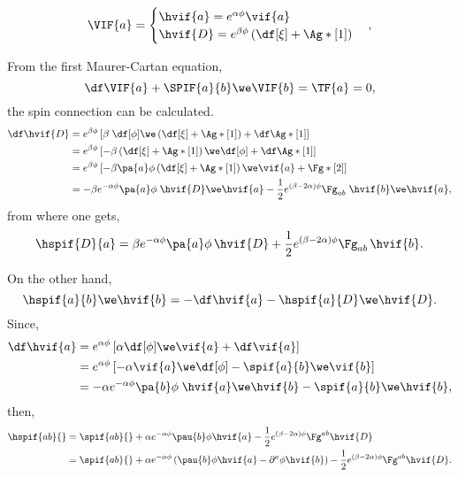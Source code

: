 \begin{equation}
  \VIF{a} = 
  \begin{cases}
    \hvif{a} = e^{\alpha\phi} \vif{a}\\
    \hvif{D} = e^{\beta\phi} \left( \df[\xi] + \Ag*[1] \right)
  \end{cases},
\end{equation}

From the first Maurer-Cartan equation,
\begin{equation}
  \df \VIF{a} + \SPIF{a}{b} \we \VIF{b} = \TF{a} = 0,
\end{equation}
the spin connection can be calculated.
\begin{align}
  \df\hvif{D}
  &= e^{\beta \phi} \left[ \beta \; \df[\phi] \we \left( \df[\xi] + \Ag*[1] \right) + \df\Ag*[1] \right] \nonumber\\
  &= e^{\beta \phi} \left[ -\beta \left( \df[\xi] + \Ag*[1] \right) \we \df[\phi] + \df \Ag*[1] \right] \nonumber\\
  &= e^{\beta \phi} \left[ -\beta \pa{a}\phi \left( \df[\xi] + \Ag*[1] \right) \we \vif{a} + \Fg*[2] \right] \nonumber\\
  &= - \beta e^{-\alpha \phi} \pa{a} \phi \; \hvif{D} \we \hvif{a} - \frac{1}{2} e^{(\beta - 2\alpha) \phi} \Fg_{a b} \; \hvif{b} \we \hvif{a},
\end{align}
from where one gets,
\begin{equation}
  \hspif{D}{a} = \beta e^{-\alpha \phi} \pa{a} \phi \, \hvif{D} + \frac{1}{2} e^{(\beta - 2\alpha) \phi} \Fg_{a b} \, \hvif{b}.
\end{equation}

On the other hand,
\begin{equation}
  \hspif{a}{b} \we \hvif{b} = - \df\hvif{a} - \hspif{a}{D} \we \hvif{D}.
\end{equation}
Since,
\begin{align}
  \df\hvif{a} 
  &= e^{\alpha \phi} \left[ \alpha \df[\phi] \we \vif{a} +  \df\vif{a} \right] \nonumber\\
  &= e^{\alpha \phi} \left[ -\alpha \vif{a} \we\df[\phi] -  \spif{a}{b} \we \vif{b} \right] \nonumber\\
  &= -\alpha e^{-\alpha \phi} \pa{b} \phi \; \hvif{a} \we \hvif{b} - \spif{a}{b} \we \hvif{b},
\end{align}
then,
\begin{align}
  \hspif{ab}{} &= \spif{ab}{} + \alpha e^{- \alpha \phi} \pau{b} \phi \hvif{a} - \frac{1}{2} e^{(\beta - 2\alpha) \phi} \Fg^{a b} \hvif{D} \nonumber\\
  &= \spif{ab}{} + \alpha e^{-\alpha \phi} \left( \pau{b} \phi \hvif{a} - \partial^{a} \phi \hvif{b} \right) - \frac{1}{2} e^{(\beta - 2\alpha) \phi} \Fg^{a b} \hvif{D}.
\end{align}


